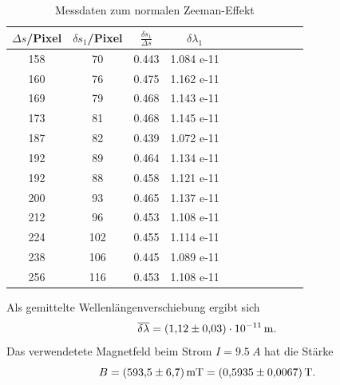 \begin{table}[h!]
  \centering
  \caption{Messdaten zum normalen Zeeman-Effekt}
  \label{tab:rot}
  \begin{tabular}{c c c c c c c c c c c}
    \toprule

      $\Delta s$/Pixel & $\delta s_{1}$/Pixel & $\frac{\delta s_{1}}{\Delta s}$ & $ \delta \lambda_{1} $  \\
      \midrule
      158       &   70            & 0.443           &     1.084 e-11    \\
      160       &   76            & 0.475           &     1.162 e-11    \\
      169       &   79            & 0.468           &     1.143 e-11    \\
      173       &   81            & 0.468           &     1.145 e-11    \\
      187       &   82            & 0.439           &     1.072 e-11    \\
      192       &   89            & 0.464           &     1.134 e-11    \\
      192       &   88            & 0.458           &     1.121 e-11    \\
      200       &   93            & 0.465           &     1.137 e-11    \\
      212       &   96            & 0.453           &     1.108 e-11    \\
      224       &   102           & 0.455           &     1.114 e-11    \\
      238       &   106           & 0.445           &     1.089 e-11    \\
      256       &   116           & 0.453           &     1.108 e-11    \\
    \bottomrule
  \end{tabular}
\end{table}
%
%
Als gemittelte Wellenlängenverschiebung ergibt sich
\begin{equation*}
  \overline{\delta \lambda} = \SI{1.12 \pm 0.03 e-11}{m}.
\end{equation*}
Das verwendetete Magnetfeld beim Strom $I=\SI{9.5}{A}$ hat die Stärke
\begin{equation*}
  B= \SI{593.5 \pm 6.7}{mT} = \SI{0.5935 \pm 0.0067}{T}.
\end{equation*}
